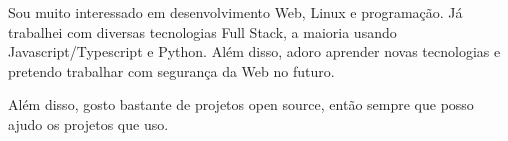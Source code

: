 

\begin{cvparagraph}

Sou muito interessado em desenvolvimento Web, Linux e programação. Já trabalhei com diversas tecnologias Full Stack, a maioria usando Javascript/Typescript e Python. 
Além disso, adoro aprender novas tecnologias e pretendo trabalhar com segurança da Web no futuro.
\end{cvparagraph}

\begin{cvparagraph}

Além disso, gosto bastante de projetos open source, então sempre que posso ajudo os projetos que uso.

\end{cvparagraph}